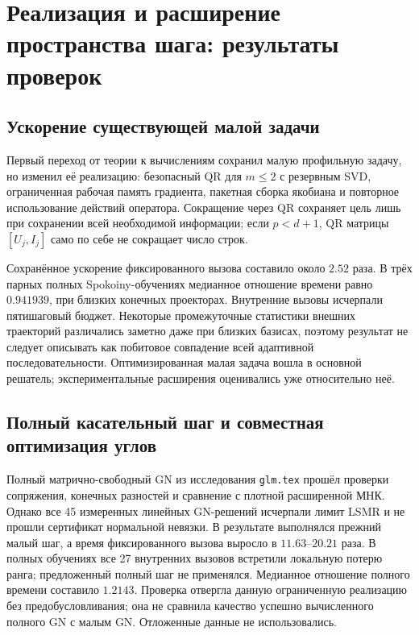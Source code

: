 \documentclass[11pt,a4paper]{article}
\numberwithin{equation}{section}
\newcommand{\file}[1]{\nolinkurl{#1}}
\begin{document}
\section{Реализация и расширение пространства шага: результаты проверок}
\label{sec:negative}

\subsection{Ускорение существующей малой задачи}

Первый переход от теории к вычислениям сохранил малую профильную
задачу, но изменил её реализацию: безопасный QR для $m\le2$
с резервным SVD, ограниченная рабочая память градиента, пакетная
сборка якобиана и повторное использование действий оператора.
Сокращение через QR сохраняет цель лишь при сохранении всей
необходимой информации; если $p<d+1$, QR матрицы $[U_j,I_j]$
само по себе не сокращает число строк.

Сохранённое ускорение фиксированного вызова составило около
$2.52$ раза. В трёх парных полных Spokoiny-обучениях медианное
отношение времени равно $0.941939$, при близких конечных проекторах.
Внутренние вызовы исчерпали пятишаговый бюджет. Некоторые промежуточные
статистики внешних траекторий различались заметно даже при близких
базисах, поэтому результат не следует описывать как побитовое
совпадение всей адаптивной последовательности.
Оптимизированная малая задача вошла в основной решатель;
экспериментальные расширения оценивались уже относительно неё.
\cite{coreoptim}

\subsection{Полный касательный шаг и совместная оптимизация углов}

Полный матрично-свободный GN из исследования \file{glm.tex}
прошёл проверки сопряжения, конечных разностей и сравнение
с плотной расширенной МНК. Однако все 45 измеренных линейных
GN-решений исчерпали лимит LSMR и не прошли сертификат нормальной
невязки. В результате выполнялся прежний малый шаг, а время
фиксированного вызова выросло в $11.63$--$20.21$ раза.
В полных обучениях все 27 внутренних вызовов встретили локальную
потерю ранга; предложенный полный шаг не применялся.
Медианное отношение полного времени составило $1.2143$.
Проверка отвергла данную ограниченную реализацию без предобусловливания;
она не сравнила качество успешно вычисленного полного GN с малым GN.
Отложенные данные не использовались.\cite{glmcheck}
\end{document}
